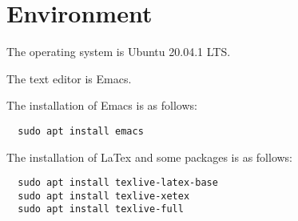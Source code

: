 \chapter{Environment}

The operating system is Ubuntu 20.04.1 LTS.

The text editor is Emacs.

The installation of Emacs is as follows:

\lstset{language=sh}
\begin{lstlisting}
  sudo apt install emacs
\end{lstlisting}

The installation of LaTex and some packages is as follows:
\begin{lstlisting}
  sudo apt install texlive-latex-base
  sudo apt install texlive-xetex
  sudo apt install texlive-full
\end{lstlisting}






